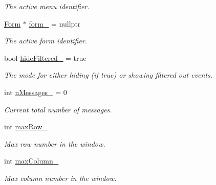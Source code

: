 \begin{DoxyCompactItemize}
\begin{DoxyCompactList}\small\item\em The active menu identifier. \end{DoxyCompactList}\item 
\hyperlink{structForm}{Form} $\ast$ \hyperlink{structLogWindow_ad565f05021299136a5a2d4398cbfe0bc}{form\+\_\+} = nullptr\hypertarget{structLogWindow_ad565f05021299136a5a2d4398cbfe0bc}{}\label{structLogWindow_ad565f05021299136a5a2d4398cbfe0bc}

\begin{DoxyCompactList}\small\item\em The active form identifier. \end{DoxyCompactList}\item 
bool \hyperlink{structLogWindow_a56d791526d401dfbaa9c582e535f3e90}{hide\+Filtered\+\_\+} = true\hypertarget{structLogWindow_a56d791526d401dfbaa9c582e535f3e90}{}\label{structLogWindow_a56d791526d401dfbaa9c582e535f3e90}

\begin{DoxyCompactList}\small\item\em The mode for either hiding (if {\ttfamily true}) or showing filtered out events. \end{DoxyCompactList}\item 
int \hyperlink{structLogWindow_a98834e7eaf9792d3e912e659bc854221}{n\+Messages\+\_\+} = 0\hypertarget{structLogWindow_a98834e7eaf9792d3e912e659bc854221}{}\label{structLogWindow_a98834e7eaf9792d3e912e659bc854221}

\begin{DoxyCompactList}\small\item\em Current total number of messages. \end{DoxyCompactList}\item 
int \hyperlink{structLogWindow_aed87c3f2b5a1a0ecc76e8c25eceb0f1f}{max\+Row\+\_\+}\hypertarget{structLogWindow_aed87c3f2b5a1a0ecc76e8c25eceb0f1f}{}\label{structLogWindow_aed87c3f2b5a1a0ecc76e8c25eceb0f1f}

\begin{DoxyCompactList}\small\item\em Max row number in the window. \end{DoxyCompactList}\item 
int \hyperlink{structLogWindow_ac3dba1911459eb7cfa53ca1631298d50}{max\+Column\+\_\+}\hypertarget{structLogWindow_ac3dba1911459eb7cfa53ca1631298d50}{}\label{structLogWindow_ac3dba1911459eb7cfa53ca1631298d50}

\begin{DoxyCompactList}\small\item\em Max column number in the window. \end{DoxyCompactList}\end{DoxyCompactItemize}



